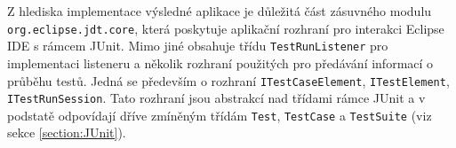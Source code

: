   Z hlediska implementace výsledné aplikace je důležitá část zásuvného modulu \texttt{org.eclipse.jdt.core}, která poskytuje aplikační rozhraní pro interakci Eclipse IDE s rámcem JUnit. Mimo jiné obsahuje třídu \texttt{TestRunListener} pro implementaci listeneru a několik rozhraní použitých pro předávání informací o průběhu testů. Jedná se především o rozhraní \texttt{ITestCaseElement}, \texttt{ITestElement}, \texttt{ITestRunSession}. Tato rozhraní jsou abstrakcí nad třídami rámce JUnit a v podstatě odpovídají dříve zmíněným třídám \texttt{Test}, \texttt{TestCase} a \texttt{TestSuite} (viz sekce \ref{section:JUnit}).
